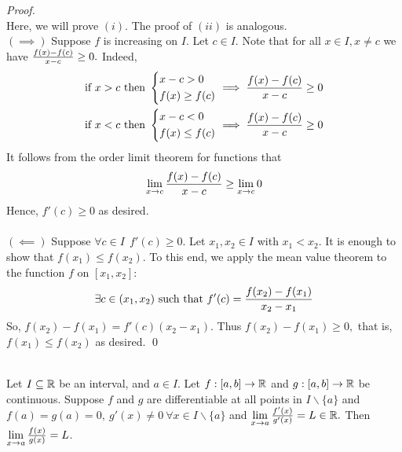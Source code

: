 \begin{proof} \leavevmode\\
    Here, we will prove $(i)$.
    The proof of $(ii)$ is analogous. \\
    $(\implies)$ Suppose $f$ is increasing on $I$. Let $c\in I$. Note that for all $x\in I, x \not = c$ we have $\frac{f(x) - f(c)}{x - c} \geq 0.$ Indeed,
    \begin{align*}
        &\text{if $x > c$ then }
        \begin{cases*}
            x - c > 0 \\
            f(x) \geq f(c) 
        \end{cases*} \implies \slope{f(x)}{f(c)}{x}{c} \geq 0 \\
        &\text{if $x<c$ then }
        \begin{cases*}
            x-c < 0 \\
            f(x) \leq f(c)
        \end{cases*} \implies \slope{f(x)}{f(c)}{x}{c} \geq 0
    \end{align*}
    It follows from the order limit theorem for functions that 
    $$
    \lim \limits_{x \to c} \frac{f(x) - f(c)}{x-c} \geq \lim \limits_{x \to c}0
    $$
    Hence, $f'(c) \geq 0$ as desired. \\ \\
    $(\impliedby)$ Suppose $\forall c \in I ~~f'(c) \geq 0.$ Let $x_1, x_2 \in I$ with $x_1 < x_2$. It is enough to show that $f(x_1) \leq f(x_2)$. To this end, we apply the mean value theorem to the function $f$ on $[x_1, x_2]:$
    $$
    \exists c \in (x_1, x_2) \text{ such that } f'(c) = \frac{f(x_2) - f(x_1)}{x_2 - x_1}
    $$
    So, $f(x_2)-f(x_1) = f'(c)(x_2 - x_1).$ Thus $f(x_2) - f(x_1) \geq 0,$ that is, $f(x_1) \leq f(x_2)$ as desired.
    \qed
\end{proof}

\begin{theorem} \leavevmode\\
    \label{Thm5.13}
    Let $I \subseteq \mathbb{R}$ be an interval, and $a\in I$. Let $f:[a,b] \to \mathbb{R}$ and $g:[a,b] \to \mathbb{R}$ be continuous. Suppose $f$ and $g$ are differentiable at all points in $I \backslash \{a\}$ and $f(a) = g(a) = 0, ~g'(x) \not = 0 ~\forall x \in I \backslash \{a\}$ and $\lim \limits_{x \to a} \frac{f'(x)}{g'(x)} = L \in \mathbb{R}.$ Then $\lim \limits_{x \to a} \frac{f(x)}{g(x)} = L$.
\end{theorem}

